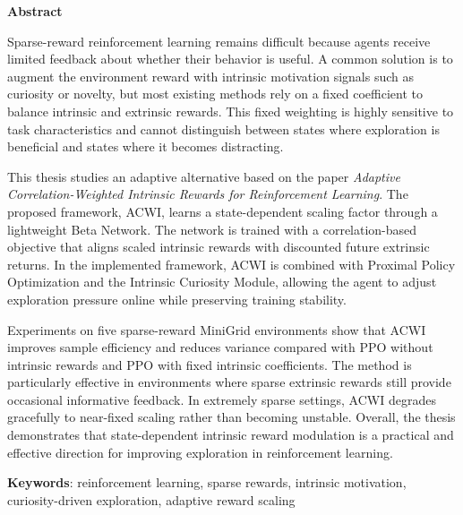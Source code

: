 \begin{center}
\textbf{\large{Abstract}}
\end{center}

\begin{small}
Sparse-reward reinforcement learning remains difficult because agents receive limited feedback about whether their behavior is useful. A common solution is to augment the environment reward with intrinsic motivation signals such as curiosity or novelty, but most existing methods rely on a fixed coefficient to balance intrinsic and extrinsic rewards. This fixed weighting is highly sensitive to task characteristics and cannot distinguish between states where exploration is beneficial and states where it becomes distracting.

This thesis studies an adaptive alternative based on the paper \textit{Adaptive Correlation-Weighted Intrinsic Rewards for Reinforcement Learning}. The proposed framework, ACWI, learns a state-dependent scaling factor through a lightweight Beta Network. The network is trained with a correlation-based objective that aligns scaled intrinsic rewards with discounted future extrinsic returns. In the implemented framework, ACWI is combined with Proximal Policy Optimization and the Intrinsic Curiosity Module, allowing the agent to adjust exploration pressure online while preserving training stability.

Experiments on five sparse-reward MiniGrid environments show that ACWI improves sample efficiency and reduces variance compared with PPO without intrinsic rewards and PPO with fixed intrinsic coefficients. The method is particularly effective in environments where sparse extrinsic rewards still provide occasional informative feedback. In extremely sparse settings, ACWI degrades gracefully to near-fixed scaling rather than becoming unstable. Overall, the thesis demonstrates that state-dependent intrinsic reward modulation is a practical and effective direction for improving exploration in reinforcement learning.

\vspace*{1cm}
\textbf{Keywords}: reinforcement learning, sparse rewards, intrinsic motivation, curiosity-driven exploration, adaptive reward scaling
\end{small}
